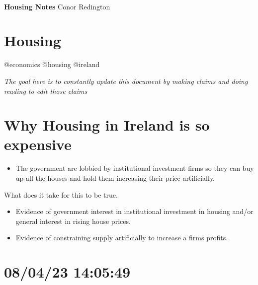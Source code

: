 \documentclass[11pt]{article}
\begin{document}
\thispagestyle{empty}
\bigskip \
\vspace{0.1cm}

\begin{center}
{\fontsize{36}{36} \selectfont \bf \sffamily Housing Notes}
\vskip 24pt
{\fontsize{18}{18} \selectfont \rmfamily Conor Redington} 
\vskip 24pt
\end{center}

{\parindent0pt \baselineskip=15.5pt \lipsum[1-4]}

\newpage
\microtoc
\newpage

\hypertarget{housing}{%
\section{Housing}\label{housing}}

@economics @housing @ireland

\emph{The goal here is to constantly update this document by making
claims and doing reading to edit those claims}

\hypertarget{why-housing-in-ireland-is-so-expensive}{%
\section{Why Housing in Ireland is so
expensive}\label{why-housing-in-ireland-is-so-expensive}}

\begin{itemize}
\tightlist
\item
  The government are lobbied by institutional investment firms so they
  can buy up all the houses and hold them increasing their price
  artificially.
\end{itemize}

What does it take for this to be true.

\begin{itemize}
\tightlist
\item
  Evidence of government interest in institutional investment in housing
  and/or general interest in rising house prices.
\item
  Evidence of constraining supply artificially to increase a firms
  profits.
\end{itemize}

\hypertarget{section}{%
\section{08/04/23 14:05:49}\label{section}}
\end{document}
